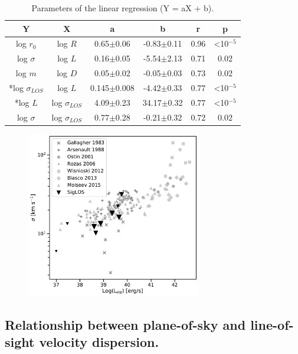 \documentclass[fleqn,usenatbib, useAMS, a4paper]{mnras}
\begin{document}
\begin{table}
\begin{center}\caption{Parameters of the linear regression (Y = aX + b).}
\begin{tabular}{cccccc}\hline
Y                    &X         &a               &b                &r     & p                \\ \hline
log \(r_0\)          &log \(R\) &0.65\(\pm\)0.06 &-0.83\(\pm\)0.11 & 0.96 & <10\(^{-5}\)    \\ 
log \(\sigma\)       &log \(L\) &0.16\(\pm\)0.05 &-5.54\(\pm\)2.13 & 0.71 & 0.02             \\
log \(m\)            &log \(D\) &0.05\(\pm\)0.02 &-0.05\(\pm\)0.03 & 0.73 & 0.02  \\ 
*log \(\sigma_{LOS}\) &log \(L\) &0.145\(\pm\)0.008 &-4.42\(\pm\)0.33 & 0.77 & <10\(^{-5}\)  \\ 
*log \(L\) &log \(\sigma_{LOS}\) &4.09\(\pm\)0.23 &34.17\(\pm\)0.32 & 0.77 & <10\(^{-5}\)  \\ 
log \(\sigma\)       &log \(\sigma_{LOS}\) &0.77\(\pm\)0.28 &-0.21\(\pm\)0.32 &0.72 & 0.02 \\ \hline
\end{tabular}\label{tab:RestStats}
\end{center}
\end{table} 

\begin{figure}
\centering 
\includegraphics[width=3in]{Figures/lvss.pdf}
\caption{}
\label{fig:sigvsl}
\end{figure}

\subsection{Relationship between plane-of-sky and line-of-sight velocity dispersion.}
\end{document}
